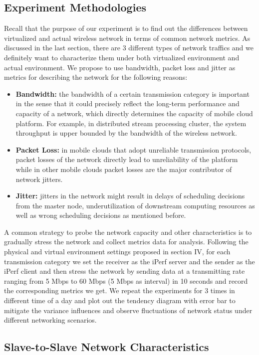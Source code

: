 \documentclass[journal,comsoc]{IEEEtran}
\begin{document}
\subsection{Experiment Methodologies}
Recall that the purpose of our experiment is to find out the differences between virtualized and actual wireless network in terms of common network metrics. As discussed in the last section, there are 3 different types of network traffics and we definitely want to characterize them under both virtualized environment and actual environment. We propose to use bandwidth, packet loss and jitter as metrics for describing the network for the following reasons:
\begin{itemize}
	\item {\bf Bandwidth: }the bandwidth of a certain transmission category is important in the sense that it could precisely reflect the long-term performance and capacity of a network, which directly determines the capacity of mobile cloud platform. For example, in distributed stream processing cluster, the system throughput is upper bounded by the bandwidth of the wireless network.
	\item {\bf Packet Loss: }in mobile clouds that adopt unreliable transmission protocols, packet losses of the network directly lead to unreliability of the platform while in other mobile clouds packet losses are the major contributor of network jitters.
	\item {\bf Jitter: }jitters in the network might result in delays of scheduling decisions from the master node, underutilization of downstream computing resources as well as wrong scheduling decisions as mentioned before.
\end{itemize}
A common strategy to probe the network capacity and other characteristics is to gradually stress the network and collect metrics data for analysis. Following the physical and virtual environment settings proposed in section IV, for each transmission category we set the receiver as the iPerf server and the sender as the iPerf client and then stress the network by sending data at a transmitting rate ranging from 5 Mbps to 60 Mbps (5 Mbps as interval) in 10 seconds and record the corresponding metrics we get. We repeat the experiments for 3 times in different time of a day and plot out the tendency diagram with error bar to mitigate the variance influences and observe fluctuations of network status under different networking scenarios.


\subsection{Slave-to-Slave Network Characteristics}
\end{document}
